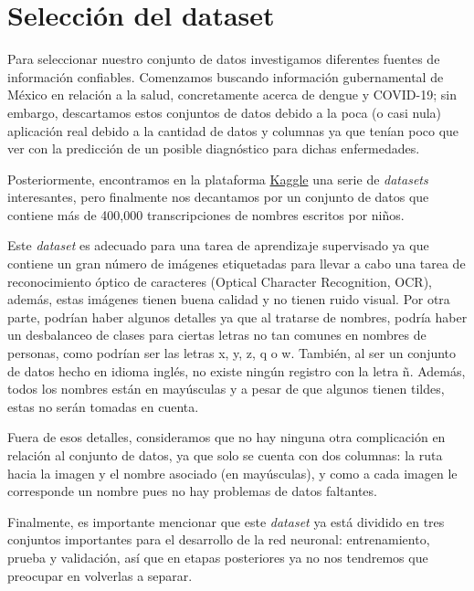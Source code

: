 \documentclass[10pt]{article}
\begin{document}
	\section{Selección del dataset}
	Para seleccionar nuestro conjunto de datos investigamos diferentes fuentes de información confiables. Comenzamos buscando información gubernamental de México en relación a la salud, concretamente acerca de dengue y COVID-19; sin embargo, descartamos estos conjuntos de datos debido a la poca (o casi nula) aplicación real debido a la cantidad de datos y columnas ya que tenían poco que ver con la predicción de un posible diagnóstico para dichas enfermedades. \par
	Posteriormente, encontramos en la plataforma \href{www.kaggle.com}{Kaggle} una serie de \textit{datasets} interesantes, pero finalmente nos decantamos por un conjunto de datos que contiene más de 400,000 transcripciones de nombres escritos por niños. \par
	Este \textit{dataset} es adecuado para una tarea de aprendizaje supervisado ya que contiene un gran número de imágenes etiquetadas para llevar a cabo una tarea de reconocimiento óptico de caracteres (Optical Character Recognition, OCR), además, estas imágenes tienen buena calidad y no tienen ruido visual. Por otra parte, podrían haber algunos detalles ya que al tratarse de nombres, podría haber un desbalanceo de clases para ciertas letras no tan comunes en nombres de personas, como podrían ser las letras x, y, z, q o w. También, al ser un conjunto de datos hecho en idioma inglés, no existe ningún registro con la letra ñ. Además, todos los nombres están en mayúsculas y a pesar de que algunos tienen tildes, estas no serán tomadas en cuenta. \par
	Fuera de esos detalles, consideramos que no hay ninguna otra complicación en relación al conjunto de datos, ya que solo se cuenta con dos columnas: la ruta hacia la imagen y el nombre asociado (en mayúsculas), y como a cada imagen le corresponde un nombre pues no hay problemas de datos faltantes. \par
	Finalmente, es importante mencionar que este \textit{dataset} ya está dividido en tres conjuntos importantes para el desarrollo de la red neuronal: entrenamiento, prueba y validación, así que en etapas posteriores ya no nos tendremos que preocupar en volverlas a separar.
	
\end{document}
